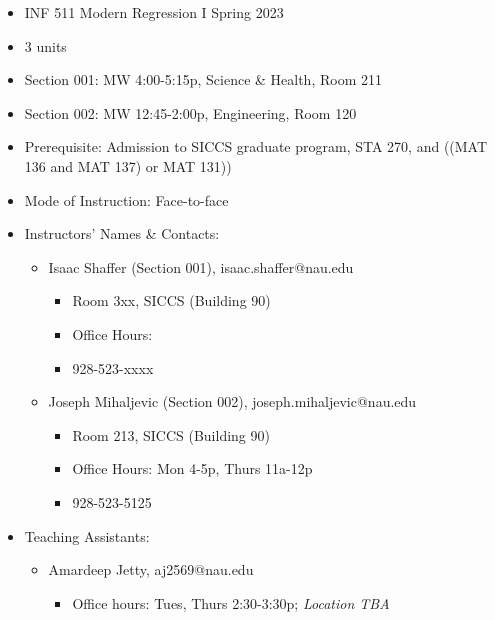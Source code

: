 \documentclass[
  letterpaper,
  DIV=11,
  numbers=noendperiod]{scrreprt}
\providecommand{\tightlist}{%
  \setlength{\itemsep}{0pt}\setlength{\parskip}{0pt}}\usepackage{longtable,booktabs,array}
\begin{document}
\begin{itemize}
\tightlist
\item
  INF 511 Modern Regression I Spring 2023
\item
  3 units
\item
  Section 001: MW 4:00-5:15p, Science \& Health, Room 211
\item
  Section 002: MW 12:45-2:00p, Engineering, Room 120
\item
  Prerequisite: Admission to SICCS graduate program, STA 270, and ((MAT
  136 and MAT 137) or MAT 131))
\item
  Mode of Instruction: Face-to-face
\item
  Instructors' Names \& Contacts:

  \begin{itemize}
  \tightlist
  \item
    Isaac Shaffer (Section 001), isaac.shaffer@nau.edu

    \begin{itemize}
    \tightlist
    \item
      Room 3xx, SICCS (Building 90)
    \item
      Office Hours:
    \item
      928-523-xxxx
    \end{itemize}
  \item
    Joseph Mihaljevic (Section 002), joseph.mihaljevic@nau.edu

    \begin{itemize}
    \tightlist
    \item
      Room 213, SICCS (Building 90)
    \item
      Office Hours: Mon 4-5p, Thurs 11a-12p
    \item
      928-523-5125
    \end{itemize}
  \end{itemize}
\item
  Teaching Assistants:

  \begin{itemize}
  \tightlist
  \item
    Amardeep Jetty, aj2569@nau.edu

    \begin{itemize}
    \tightlist
    \item
      Office hours: Tues, Thurs 2:30-3:30p; \emph{Location TBA}
    \end{itemize}
  \end{itemize}
\end{itemize}
\end{document}

